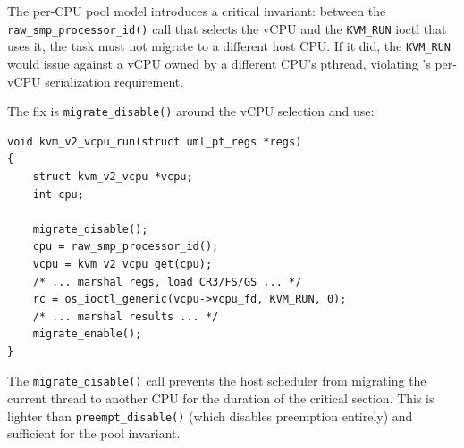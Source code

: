 The per-CPU pool model introduces a critical invariant: between the
\texttt{raw\_smp\_processor\_id()} call that selects the vCPU and the
\texttt{KVM\_RUN} ioctl that uses it, the task must not migrate to a
different host CPU.  If it did, the \texttt{KVM\_RUN} would issue against
a vCPU owned by a different CPU's pthread, violating \KVM{}'s per-vCPU
serialization requirement.

The fix is \texttt{migrate\_disable()} around the vCPU selection and use:

\begin{lstlisting}[language=KernelC,
    caption={Per-CPU vCPU dispatch with migrate\_disable},
    label={lst:migrate-disable}]
void kvm_v2_vcpu_run(struct uml_pt_regs *regs)
{
    struct kvm_v2_vcpu *vcpu;
    int cpu;

    migrate_disable();
    cpu = raw_smp_processor_id();
    vcpu = kvm_v2_vcpu_get(cpu);
    /* ... marshal regs, load CR3/FS/GS ... */
    rc = os_ioctl_generic(vcpu->vcpu_fd, KVM_RUN, 0);
    /* ... marshal results ... */
    migrate_enable();
}
\end{lstlisting}

The \texttt{migrate\_disable()} call prevents the host scheduler from
migrating the current thread to another CPU for the duration of the
critical section.  This is lighter than \texttt{preempt\_disable()} (which
disables preemption entirely) and sufficient for the pool invariant.

